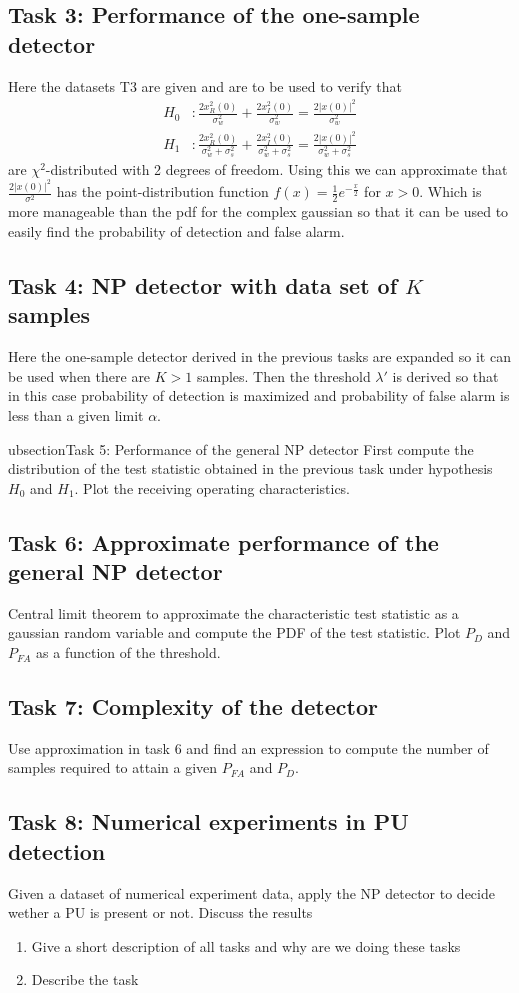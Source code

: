 \subsection{Task 3: Performance of the one-sample detector}
Here the datasets T3 are given and are to be used to verify that
\begin{align}
	H_0 &: \frac{2x_R^2(0)}{\sigma_w^2}+\frac{2x_I^2(0)}{\sigma_w^2}=\frac{2|x(0)|^2}{\sigma_w^2}\label{eq:chi_sq_h0}\\
	H_1 &: \frac{2x_R^2(0)}{\sigma_w^2+\sigma_s^2}+\frac{2x_I^2(0)}{\sigma_w^2+\sigma_s^2}=\frac{2|x(0)|^2}{\sigma_w^2+\sigma_s^2}\label{eq:chi_sq_h1}
\end{align}
are $\chi^2$-distributed with 2 degrees of freedom. Using this we can approximate that $\frac{2|x(0)|^2}{\sigma^2}$ has the point-distribution function $f(x) = \frac{1}{2}e^{-\frac{x}{2}}$ for $x>0$. Which is more manageable than the pdf for the complex gaussian so that it can be used to easily find the probability of detection and false alarm.

\subsection{Task 4: NP detector with data set of $K$ samples}
Here the one-sample detector derived in the previous tasks are expanded so it can be used when there are $K>1$ samples. Then the threshold $\lambda'$ is derived so that in this case probability of detection is maximized and probability of false alarm is less than a given limit $\alpha$.

ubsection{Task 5: Performance of the general NP detector}
First compute the distribution of the test statistic obtained in the previous task under hypothesis $H_0$ and $H_1$. Plot the receiving operating characteristics.

\subsection{Task 6: Approximate performance of the general NP detector}
Central limit theorem to approximate the characteristic test statistic as a gaussian random variable and compute the PDF of the test statistic. Plot $P_D$ and $P_{FA}$ as a function of the threshold.

\subsection{Task 7: Complexity of the detector}
Use approximation in task 6 and find an expression to compute the number of samples required to attain a given $P_{FA}$ and $P_D$.

\subsection{Task 8: Numerical experiments in PU detection}
Given a dataset of numerical experiment data, apply the NP detector to decide wether a PU is present or not. Discuss the results
\begin{enumerate}[i]
	\item Give a short description of all tasks and why are we doing these tasks
	\item Describe the task
\end{enumerate}